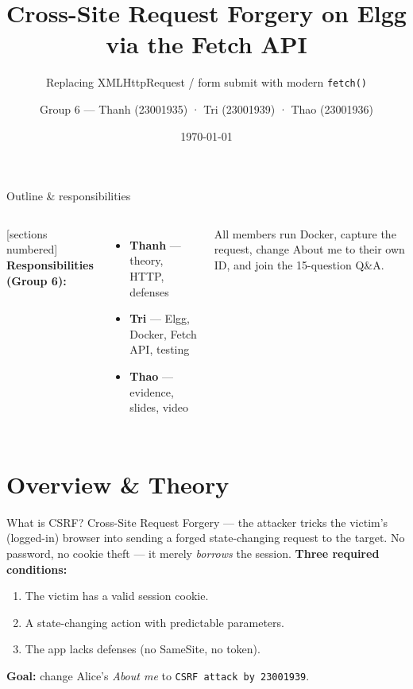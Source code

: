 \documentclass[11pt,aspectratio=169]{beamer}
\title{Cross-Site Request Forgery on Elgg via the Fetch API}
\subtitle{Replacing XMLHttpRequest / form submit with modern \texttt{fetch()}}
\author{Group 6 — Thanh (23001935) · Tri (23001939) · Thao (23001936)}
\institute{Computer Security — VNU University of Science}
\date{\today}
\begin{document}
{
\begin{frame}[plain]\titlepage\end{frame}}

\begin{frame}{Outline \& responsibilities}
  \begin{columns}[t]
      [sections numbered]
      \tableofcontents
      \footnotesize
      \textbf{Responsibilities (Group 6):}
      \begin{itemize}\footnotesize
        \item \textbf{Thanh} — theory, HTTP, defenses
        \item \textbf{Tri} — Elgg, Docker, Fetch API, testing
        \item \textbf{Thao} — evidence, slides, video
      \end{itemize}
      \scriptsize\color{slate} All members run Docker, capture the request, change About me to their own ID, and join the 15-question Q\&A.
  \end{columns}
\end{frame}

\section{Overview \& Theory}

\begin{frame}{What is CSRF?}
  \alert{Cross-Site Request Forgery} — the attacker tricks the victim's (logged-in) browser into sending a forged state-changing request to the target. No password, no cookie theft — it merely \emph{borrows} the session.
  \vfill
  \textbf{Three required conditions:}
  \begin{enumerate}
    \item The victim has a valid session cookie.
    \item A state-changing action with \alert{predictable} parameters.
    \item The app \alert{lacks defenses} (no SameSite, no token).
  \end{enumerate}
  \vfill
  \footnotesize\textbf{Goal:} change Alice's \emph{About me} to \texttt{CSRF attack by 23001939}.
\end{frame}
\end{document}
